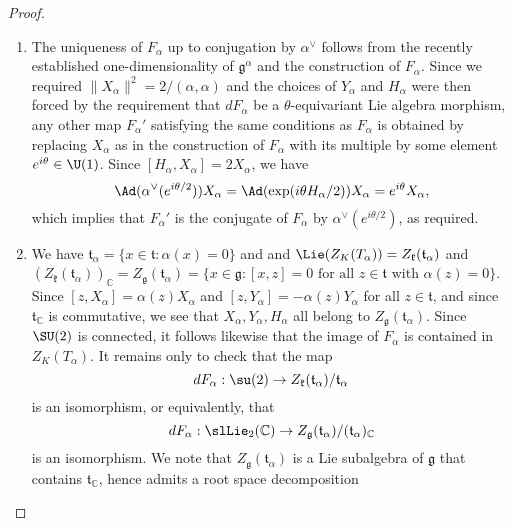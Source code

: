 \documentclass[reqno]{amsart} 
\begin{document}
\begin{proof}
\begin{enumerate}
  \item The uniqueness of $F_\alpha$ up to conjugation by $\alpha^\vee$ follows from the recently established one-dimensionality of $\mathfrak{g}^\alpha$ and the construction of $F_\alpha$.  Since we required $\|X_\alpha \|^2 = 2/(\alpha,\alpha)$ and the choices of $Y_\alpha$ and $H_\alpha$ were then forced by the requirement that $d F_\alpha$ be a $\theta$-equivariant Lie algebra morphism, any other map $F_\alpha '$ satisfying the same conditions as $F_\alpha$ is obtained by replacing $X_\alpha$ as in the construction of $F_\alpha$ with its multiple by some element $e^{i \theta} \in \U(1)$.  Since $[H_\alpha, X_\alpha] = 2 X_\alpha$, we have
    \begin{equation}\label{eq:}
      \Ad(\alpha^\vee(e^{i \theta/2}))
      X_\alpha 
      =
      \Ad(\exp(i \theta H_\alpha/2))
      X_\alpha
      =
      e^{i \theta} X_\alpha,
    \end{equation}
    which implies that $F_\alpha '$ is the conjugate of $F_\alpha$ by $\alpha^\vee(e^{i \theta/2})$, as required.
  \item We have $\mathfrak{t}_{\alpha} = \{x \in \mathfrak{t} : \alpha(x) =0\}$ and and $\Lie(Z_K(T_\alpha)) = Z_{\mathfrak{k}}(\mathfrak{t}_\alpha)$ and $(Z_{\mathfrak{k}}(\mathfrak{t}_\alpha))_{\mathbb{C}} = Z_{\mathfrak{g}}(\mathfrak{t}_\alpha) = \{x \in \mathfrak{g} : [x,z] = 0 \text{ for all } z \in \mathfrak{t} \text{ with } \alpha(z) = 0\}$.  Since $[z,X_\alpha] = \alpha(z) X_\alpha$ and $[z,Y_\alpha] = -\alpha(z) Y_\alpha$ for all $z \in \mathfrak{t}$, and since $\mathfrak{t}_{\mathbb{C}}$ is commutative, we see that $X_\alpha, Y_\alpha, H_\alpha$ all belong to $Z_{\mathfrak{g}}(\mathfrak{t}_\alpha)$.  Since $\SU(2)$ is connected, it follows likewise that the image of $F_\alpha$ is contained in $Z_K(T_\alpha)$.  It remains only to check that the map
    \begin{equation*}
      d F_\alpha : \su(2) \rightarrow Z_{\mathfrak{k}}(\mathfrak{t}_\alpha)/\mathfrak{t}_\alpha
    \end{equation*}
    is an isomorphism, or equivalently, that
    \begin{equation}\label{eq:required-lie-alg-isom-involving-F-alpha}
      d F_\alpha : \slLie_2(\mathbb{C}) \rightarrow
      Z_{\mathfrak{g}}(\mathfrak{t}_\alpha)
      / (\mathfrak{t}_{\alpha})_{\mathbb{C}}
    \end{equation}
    is an isomorphism.  We note that $Z_{\mathfrak{g}}(\mathfrak{t}_\alpha)$ is a Lie subalgebra of $\mathfrak{g}$ that contains $\mathfrak{t}_{\mathbb{C}}$, hence admits a root space decomposition

\end{enumerate}
\end{proof}
\end{document}
